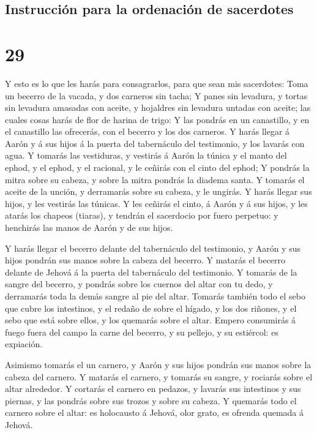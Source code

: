\hypertarget{instrucciuxf3n-para-la-ordenaciuxf3n-de-sacerdotes}{%
\subsection{Instrucción para la ordenación de
sacerdotes}\label{instrucciuxf3n-para-la-ordenaciuxf3n-de-sacerdotes}}

\hypertarget{section-28}{%
\section{29}\label{section-28}}

 Y esto es lo que les harás para consagrarlos, para que sean
mis sacerdotes: Toma un becerro de la vacada, y dos carneros sin tacha;
 Y panes sin levadura, y tortas sin levadura amasadas con
aceite, y hojaldres sin levadura untadas con aceite; las cuales cosas
harás de flor de harina de trigo:  Y las pondrás en un
canastillo, y en el canastillo las ofrecerás, con el becerro y los dos
carneros.  Y harás llegar á Aarón y á sus hijos á la puerta
del tabernáculo del testimonio, y los lavarás con agua.  Y
tomarás las vestiduras, y vestirás á Aarón la túnica y el manto del
ephod, y el ephod, y el racional, y le ceñirás con el cinto del ephod;
 Y pondrás la mitra sobre su cabeza, y sobre la mitra
pondrás la diadema santa.  Y tomarás el aceite de la unción,
y derramarás sobre su cabeza, y le ungirás.  Y harás llegar
sus hijos, y les vestirás las túnicas.  Y les ceñirás el
cinto, á Aarón y á sus hijos, y les atarás los chapeos (tiaras), y
tendrán el sacerdocio por fuero perpetuo: y henchirás las manos de Aarón
y de sus hijos.

 Y harás llegar el becerro delante del tabernáculo del
testimonio, y Aarón y sus hijos pondrán sus manos sobre la cabeza del
becerro.  Y matarás el becerro delante de Jehová á la
puerta del tabernáculo del testimonio.  Y tomarás de la
sangre del becerro, y pondrás sobre los cuernos del altar con tu dedo, y
derramarás toda la demás sangre al pie del altar.  Tomarás
también todo el sebo que cubre los intestinos, y el redaño de sobre el
hígado, y los dos riñones, y el sebo que está sobre ellos, y los
quemarás sobre el altar.  Empero consumirás á fuego fuera
del campo la carne del becerro, y su pellejo, y su estiércol: es
expiación.

 Asimismo tomarás el un carnero, y Aarón y sus hijos
pondrán sus manos sobre la cabeza del carnero.  Y matarás
el carnero, y tomarás su sangre, y rociarás sobre el altar alrededor.
 Y cortarás el carnero en pedazos, y lavarás sus intestinos
y sus piernas, y las pondrás sobre sus trozos y sobre su cabeza.
 Y quemarás todo el carnero sobre el altar: es holocausto á
Jehová, olor grato, es ofrenda quemada á Jehová.


